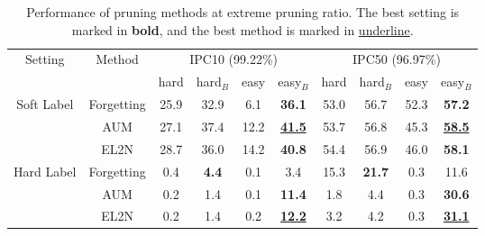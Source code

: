 \begin{table}[t]
\caption{Performance of pruning methods at extreme pruning ratio. The best setting is marked in \textbf{bold}, and the best method is marked in \underline{underline}.}
\label{tab:pruning-rule}
\centering
\scriptsize
\setlength{\tabcolsep}{0.4em}
\begin{tabular}{@{}c|c|cccc|cccc@{}}
\toprule
\multirow{2}{*}{Setting}                            &   \multirow{2}{*}{Method}        & \multicolumn{4}{c|}{IPC10 (99.22\%)}    & \multicolumn{4}{c}{IPC50 (96.97\%)}     \\
                            &            & hard & hard$_B$ & easy & easy$_B$ & hard & hard$_B$ & easy & easy$_B$ \\ \midrule
\multirow{3}{*}{Soft Label} & Forgetting & 25.9 & 32.9   & 6.1  & \textbf{36.1}   & 53.0 & 56.7   & 52.3 & \textbf{57.2}   \\
                            & AUM        & 27.1 & 37.4   & 12.2 & \textbf{\underline{41.5}}   & 53.7 & 56.8   & 45.3 & \textbf{\underline{58.5}}   \\
                            & EL2N       & 28.7 & 36.0   & 14.2 & \textbf{40.8}   & 54.4 & 56.9   & 46.0 & \textbf{58.1}   \\ \midrule
\multirow{3}{*}{Hard Label} & Forgetting & 0.4  & \textbf{4.4}    & 0.1  & 3.4    & 15.3 & \textbf{21.7}   & 0.3  & 11.6   \\
                            & AUM        & 0.2  & 1.4    & 0.1  & \textbf{11.4}   & 1.8  & 4.4    & 0.3  & \textbf{30.6}   \\
                            & EL2N       & 0.2  & 1.4    & 0.2  & \textbf{\underline{12.2}}   & 3.2  & 4.2    & 0.3  & \textbf{\underline{31.1}}   \\ \bottomrule
\end{tabular}
\end{table}